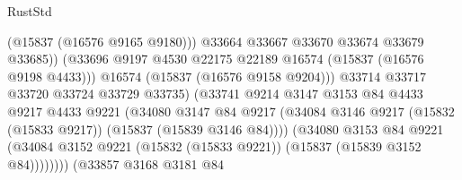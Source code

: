 \begin{lexlean}{RustStd}
\begin{coremodule}
                                              (@15837 (@16576 @9165 @9180)))
                                            @33664
                                            @33667
                                            @33670
                                            @33674
                                            @33679
                                            @33685))
                                        (@33696
                                          @9197
                                          @4530
                                          @22175
                                          @22189
                                          @16574
                                          (@15837 (@16576 @9198 @4433)))
                                        @16574
                                        (@15837 (@16576 @9158 @9204)))
                                      @33714
                                      @33717
                                      @33720
                                      @33724
                                      @33729
                                      @33735)
                                    (@33741
                                      @9214
                                      @3147
                                      @3153
                                      @84
                                      @4433
                                      @9217
                                      @4433
                                      @9221
                                      (@34080
                                        @3147
                                        @84
                                        @9217
                                        (@34084
                                          @3146
                                          @9217
                                          (@15832 (@15833 @9217))
                                          (@15837 (@15839 @3146 @84))))
                                      (@34080
                                        @3153
                                        @84
                                        @9221
                                        (@34084
                                          @3152
                                          @9221
                                          (@15832 (@15833 @9221))
                                          (@15837 (@15839 @3152 @84))))))))
                              (@33857
                                @3168
                                @3181
                                @84

\end{coremodule}
\end{lexlean}
